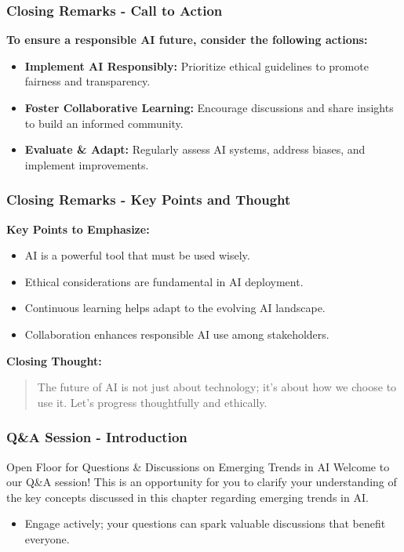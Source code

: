 \documentclass[aspectratio=169]{beamer}
\begin{document}
\begin{frame}[fragile]
    \frametitle{Closing Remarks - Call to Action}
    
    \textbf{To ensure a responsible AI future, consider the following actions:}
    
    \begin{itemize}
        \item \textbf{Implement AI Responsibly:} Prioritize ethical guidelines to promote fairness and transparency.
        \item \textbf{Foster Collaborative Learning:} Encourage discussions and share insights to build an informed community.
        \item \textbf{Evaluate \& Adapt:} Regularly assess AI systems, address biases, and implement improvements.
    \end{itemize}
\end{frame}

\begin{frame}[fragile]
    \frametitle{Closing Remarks - Key Points and Thought}
    
    \textbf{Key Points to Emphasize:}
    \begin{itemize}
        \item AI is a powerful tool that must be used wisely.
        \item Ethical considerations are fundamental in AI deployment.
        \item Continuous learning helps adapt to the evolving AI landscape.
        \item Collaboration enhances responsible AI use among stakeholders.
    \end{itemize}
    
    \textbf{Closing Thought:} 
    \begin{quote}
        The future of AI is not just about technology; it’s about how we choose to use it. 
        Let's progress thoughtfully and ethically.
    \end{quote}
\end{frame}

\begin{frame}[fragile]
    \frametitle{Q\&A Session - Introduction}
    \begin{block}{Open Floor for Questions \& Discussions on Emerging Trends in AI}
        Welcome to our Q\&A session! This is an opportunity for you to clarify your understanding of the key concepts discussed in this chapter regarding emerging trends in AI. 
        \begin{itemize}
            \item Engage actively; your questions can spark valuable discussions that benefit everyone.
        \end{itemize}
    \end{block}
\end{frame}
\end{document}
